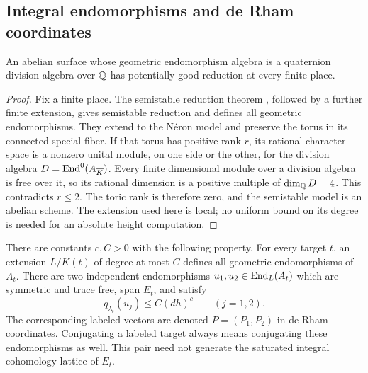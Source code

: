 \subsection{Integral endomorphisms and de Rham coordinates}

\begin{lemma}\label{lem:potential-good}
An abelian surface whose geometric endomorphism algebra is a quaternion
division algebra over $\mathbb Q$ has potentially good reduction at every finite
place.
\end{lemma}

\begin{proof}
Fix a finite place.  The semistable reduction theorem
\cite[Section~7.4, Theorem~1]{BLR1990}, followed by a further finite
extension, gives semistable reduction and defines all geometric
endomorphisms.  They extend to the N\'eron model and preserve
the torus in its connected special fiber.  If that torus has positive
rank $r$, its rational character space is a nonzero unital module, on
one side or the other, for the division algebra
$D=\operatorname{End}^0(A_{\overline K})$.  Every finite dimensional module over a
division algebra is free over it, so its rational dimension is a
positive multiple of $\dim_\mathbb Q D=4$.  This contradicts $r\le2$.
The toric rank is therefore zero, and the semistable model is an
abelian scheme.  The extension used here is local; no uniform bound on
its degree is needed for an absolute height computation.
\end{proof}

\begin{proposition}\label{prop:small-vectors}
There are constants $c,C>0$ with the following property.  For every
target $t$, an extension $L/K(t)$ of degree at most $C$ defines all
geometric endomorphisms of $A_t$.  There are two independent
endomorphisms $u_1,u_2\in\operatorname{End}_L(A_t)$ which are symmetric and trace
free, span $E_t$, and satisfy
\begin{equation}\label{eq:rosati-size}
 q_{\lambda_t}(u_j)\le C(dh)^c\qquad(j=1,2).
\end{equation}
The corresponding labeled vectors are denoted $P=(P_1,P_2)$ in de Rham
coordinates.  Conjugating a labeled target always means conjugating
these endomorphisms as well.  This pair need not generate the saturated
integral cohomology lattice of $E_t$.
\end{proposition}

